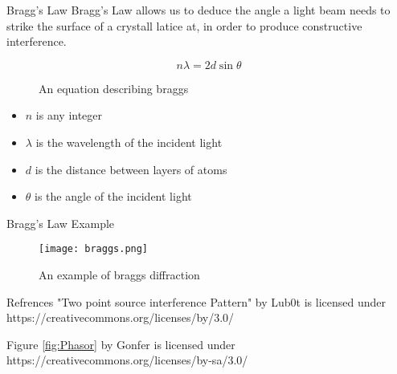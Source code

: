 \documentclass[aspectratio=169]{beamer}
\begin{document}
\begin{frame}{Bragg's Law}
	Bragg's Law allows us to deduce the angle a light beam needs to strike the surface of a crystall latice at, in order to produce constructive interference.
	
	\begin{figure}
		$$ n \lambda = 2d \sin \theta$$
		\caption{An equation describing braggs }
	\end{figure}		
	
	\begin{scriptsize}
		\begin{itemize}
		\item $n$ is any integer
		\item $\lambda$ is the wavelength of the incident light
		\item $d$ is the distance between layers of atoms
		\item $\theta$ is the angle of the incident light
		\end{itemize}
	\end{scriptsize}
\end{frame}

\begin{frame}{Bragg's Law Example}
	\begin{figure}
		\texttt{[image: braggs.png]}
		\caption{An example of braggs diffraction}
	\end{figure}
\end{frame}
				
\begin{frame}{Refrences}
	"Two point source interference Pattern" by Lub0t is licensed under https://creativecommons.org/licenses/by/3.0/
							
							
	Figure \ref{fig:Phasor} by Gonfer is licensed under https://creativecommons.org/licenses/by-sa/3.0/
							
							
\end{frame}
				
\end{document}
